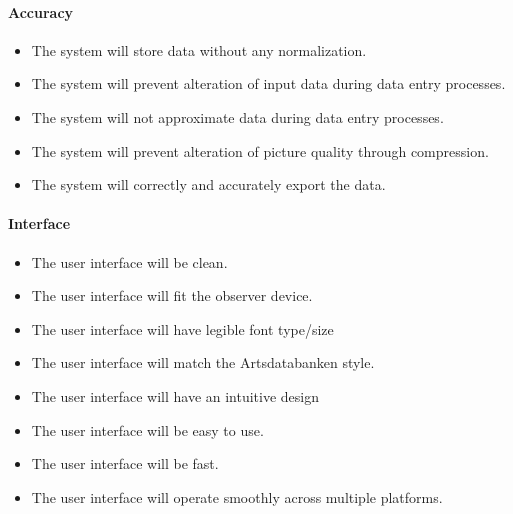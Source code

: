     \paragraph{Accuracy}
        \begin{itemize}
            \item The system will store data without any normalization.
            \item The system will prevent alteration of input data during data entry processes.
            \item The system will not approximate data during data entry processes.
            \item The system will prevent alteration of picture quality through compression.
            \item The system will correctly and accurately export the data.

        \end{itemize}
    \paragraph{Interface}
        \begin{itemize}
            \item The user interface will be clean.
            \item The user interface will fit the observer device.
            \item The user interface will have legible font type/size
            \item The user interface will match the Artsdatabanken style.
            \item The user interface will have an intuitive design
            \item The user interface will be easy to use.
            \item The user interface will be fast.
            \item The user interface will operate smoothly across multiple platforms.

        \end{itemize}
